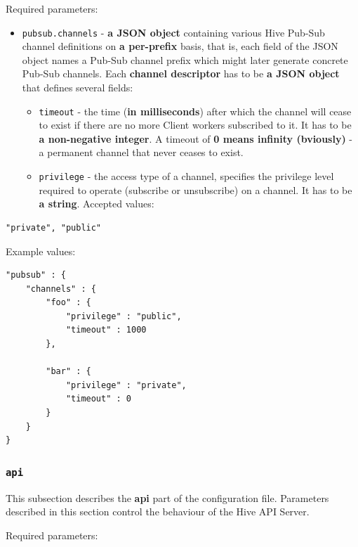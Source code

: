 \documentclass[a4paper]{article}
\begin{document}
\noindent
Required parameters:

\label{ref-pubsub_config}

\begin{itemize}
\item \texttt{pubsub.channels} - \textbf{a JSON object} containing various Hive Pub-Sub channel definitions on \textbf{a per-prefix} basis, that is, each field of the JSON object names a Pub-Sub channel prefix which might later generate concrete Pub-Sub channels. Each \textbf{channel descriptor} has to be \textbf{a JSON object} that defines several fields:
\begin{itemize}
\item \texttt{timeout} - the time (\textbf{in milliseconds}) after which the channel will cease to exist if there are no more Client workers subscribed to it. It has to be \textbf{a non-negative integer}. A timeout of \textbf{0 means infinity (bviously)} - a permanent channel that never ceases to exist.
\item \texttt{privilege} - the access type of a channel, specifies the privilege level required to operate (subscribe or unsubscribe) on a channel. It has to be \textbf{a string}. Accepted values:
\end{itemize}
\end{itemize}


\begin{verbatim}
"private", "public"
\end{verbatim}




\noindent
Example values:


\begin{verbatim}
"pubsub" : {
    "channels" : {
        "foo" : {
            "privilege" : "public",
            "timeout" : 1000
        },

        "bar" : {
            "privilege" : "private",
            "timeout" : 0
        }
    }
}
\end{verbatim}
\subsubsection{\texttt{api}}
\label{sec-3-1-6}
\label{ref-api_config}

This subsection describes the \textbf{api} part of the configuration file. Parameters described in this section control the behaviour of the Hive API Server.

\noindent
Required parameters:
\end{document}
